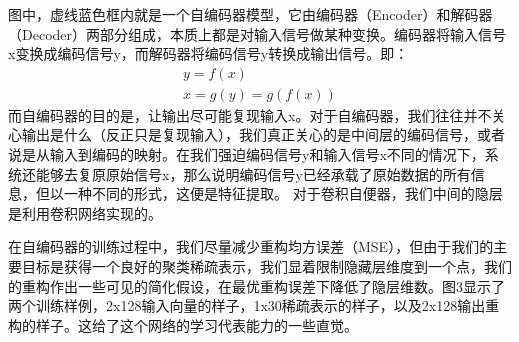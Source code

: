 图中，虚线蓝色框内就是一个自编码器模型，它由编码器（Encoder）和解码器（Decoder）两部分组成，本质上都是对输入信号做某种变换。编码器将输入信号x变换成编码信号y，而解码器将编码信号y转换成输出信号。即：
\begin{equation}
	\begin{gathered}
	y=f(x)
\\
	x=g(y)=g(f(x))
	\end{gathered}
\end{equation}
而自编码器的目的是，让输出尽可能复现输入x。对于自编码器，我们往往并不关心输出是什么（反正只是复现输入），我们真正关心的是中间层的编码信号，或者说是从输入到编码的映射。在我们强迫编码信号y和输入信号x不同的情况下，系统还能够去复原原始信号x，那么说明编码信号y已经承载了原始数据的所有信息，但以一种不同的形式，这便是特征提取。
对于卷积自便器，我们中间的隐层是利用卷积网络实现的。\par

在自编码器的训练过程中，我们尽量减少重构均方误差（MSE），但由于我们的主要目标是获得一个良好的聚类稀疏表示，我们显着限制隐藏层维度到一个点，我们的重构作出一些可见的简化假设，在最优重构误差下降低了隐层维数。图3显示了两个训练样例，2x128输入向量的样子，1x30稀疏表示的样子，以及2x128输出重构的样子。这给了这个网络的学习代表能力的一些直觉。\par


